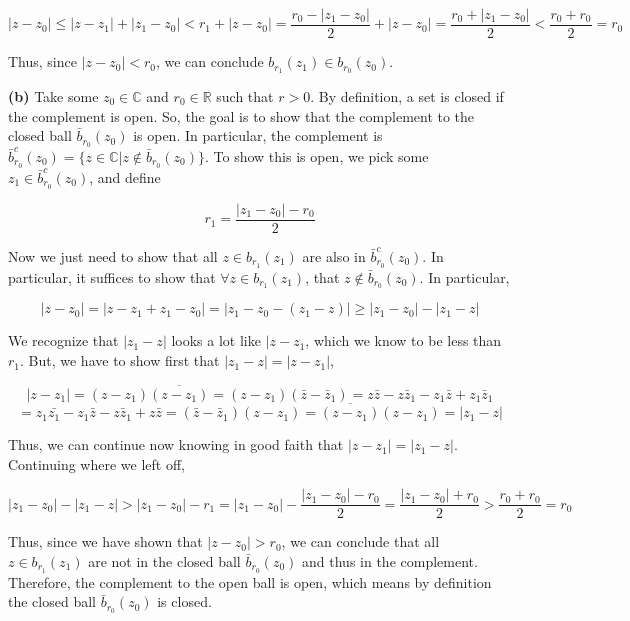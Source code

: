 \documentclass[10pt]{article}
\newcommand{\R}{\mathbb{R}}
\newcommand{\C}{\mathbb{C}}
\begin{document}
$$|z-z_{0}| \leq |z-z_{1}| + |z_{1}-z_{0}| < r_{1} + |z-z_{0}| = \frac{r_{0}-|z_{1}-z_{0}|}{2} + |z-z_{0}| = \frac{r_{0} + |z_{1} - z_{0}|}{2} < \frac{r_{0}+r_{0}}{2} = r_{0}$$

Thus, since $|z-z_{0}| < r_{0}$, we can conclude $b_{r_{1}}(z_{1}) \in b_{r_{0}}(z_{0})$.

\newpage

\textbf{(b)}
Take some $z_{0}\in \C$ and $r_{0} \in \R$ such that $r > 0$. By definition, a set is closed if the complement is open. So, the goal is to show that the complement to the closed ball $\bar{b}_{r_{0}}(z_{0})$ is open. In particular, the complement is $\bar{b}_{r_{0}}^{c}(z_{0}) = \{ z\in \C | z \notin \bar{b}_{r_{0}}(z_{0}) \}$. To show this is open, we pick some $z_{1} \in \bar{b}_{r_{0}}^{c}(z_{0})$, and define

$$r_{1} = \frac{|z_{1} - z_{0}| - r_{0}}{2}$$

Now we just need to show that all $z \in b_{r_{1}}(z_{1})$ are also in $\bar{b}_{r_{0}}^{c}(z_{0})$. In particular, it suffices to show that $\forall z \in b_{r_{1}}(z_{1})$, that $z \notin \bar{b}_{r_{0}}(z_{0})$. In particular,

$$|z - z_{0}| = |z - z_{1} + z_{1} - z_{0}| = |z_{1} - z_{0} -(z_{1} - z)| \geq |z_{1} - z_{0}| - |z_{1} - z|$$

We recognize that $|z_{1} - z|$ looks a lot like $|z - z_{1}$, which we know to be less than $r_{1}$. But, we have to show first that $|z_{1} - z| = |z-z_{1}|$,

$$|z-z_{1}| = (z-z_{1})\overline{(z-z_{1})} = (z-z_{1})(\bar{z} - \bar{z}_{1}) = z\bar{z} - z\bar{z}_{1} - z_{1}\bar{z} + z_{1}\bar{z}_{1}$$
$$= z_{1}\bar{z_{1}} - z_{1}\bar{z} - z\bar{z}_{1} + z\bar{z} = (\bar{z} - \bar{z}_{1})(z-z_{1}) = \overline{(z-z_{1})}(z-z_{1}) = |z_{1} - z|$$

Thus, we can continue now knowing in good faith that $|z-z_{1}| = |z_{1} - z|$. Continuing where we left off,

$$|z_{1} - z_{0}| - |z_{1} - z| > |z_{1} - z_{0}| - r_{1} = |z_{1}-z_{0}| - \frac{|z_{1}-z_{0}|-r_{0}}{2}= \frac{|z_{1}-z_{0}|+r_{0}}{2} > \frac{r_{0} + r_{0}}{2} = r_{0}$$

Thus, since we have shown that $|z-z_{0}| > r_{0}$, we can conclude that all $z\in b_{r_{1}}(z_{1})$ are not in the closed ball $\bar{b}_{r_{0}}(z_{0})$ and thus in the complement. Therefore, the complement to the open ball is open, which means by definition the closed ball $\bar{b}_{r_{0}}(z_{0})$ is closed.
\end{document}
